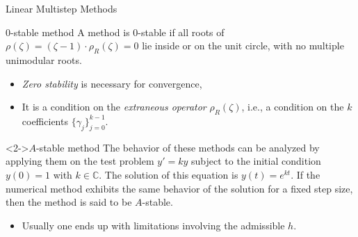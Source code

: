 \documentclass[aspectratio=169,xcolor=dvipsnames]{beamer}
\begin{document}
	\begin{frame}{Linear Multistep Methods}
	
	\begin{block}{$0$-stable method}
	A method is $0$-stable if all roots of $\rho(\zeta)= (\zeta-1)\cdot \rho_R(\zeta) = 0$ lie inside or on the unit circle, with no multiple unimodular roots.
	\end{block}
	
	\begin{itemize}
		\item[\faHammer] \textit{Zero stability} is necessary for convergence,
		\item[\faWrench] It is a condition on the \textit{extraneous operator} $\rho_R(\zeta)$, i.e., a condition on the $k$ coefficients $\{\gamma_j\}_{j=0}^{k-1}$.
	\end{itemize}

	\begin{block}<2->{$A$-stable method}
	The behavior of these methods can be analyzed by applying them on the \alert{test problem} $y' = k y$ subject to the initial condition $y(0)=1$ with $k\in \mathbb{C}$. The solution of this equation is $y(t)=e^{kt}$. If the numerical method exhibits the same behavior of the solution for a fixed step size, then the method is said to be $A$-stable.
	\end{block}

	\begin{itemize}
		\item[\faSadTear]<3-> Usually one ends up with limitations involving the admissible $h$.
	\end{itemize}
	
	\end{frame}
\end{document}

